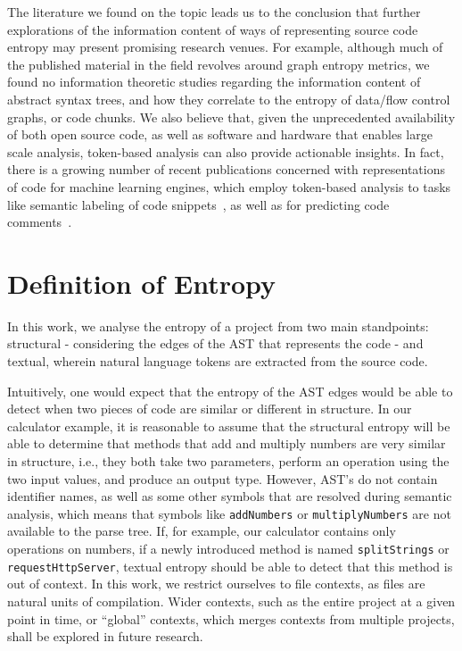 \documentclass[10pt,conference]{IEEEtran}
\begin{document}
The literature we found on the topic leads us to the conclusion that further explorations of the information content of ways of representing source code entropy may present promising research venues. For example, although much of the published material in the field revolves around graph entropy metrics, we found no information theoretic studies regarding the information content of abstract syntax trees, and how they correlate to the entropy of data/flow control graphs, or code chunks. 
We also believe that, given the unprecedented availability of both open source code, as well as software and hardware that enables large scale analysis, token-based analysis can also provide actionable insights. In fact, there is a growing number of recent publications concerned with representations of code for machine learning engines, which employ token-based analysis to tasks like semantic labeling of code snippets~\cite{allamanis2016convolutional}, as well as for predicting code comments~\cite{movshovitz-attias-cohen-2013-natural}.

\section{Definition of Entropy} \label{definition}
In this work, we analyse the entropy of a project from two main standpoints: structural - considering the edges of the AST that represents the code - and textual, wherein natural language tokens are extracted from the source code.

Intuitively, one would expect that the entropy of the AST edges would be able to detect when two pieces of code are similar or different in structure. In our calculator example, it is reasonable to assume that the structural entropy will be able to determine that methods that add and multiply numbers are very similar in structure, i.e., they both take two parameters, perform an operation using the two input values, and produce an output type. However, AST's do not contain identifier names, as well as some other symbols that are resolved during semantic analysis, which means that symbols like \texttt{addNumbers} or \texttt{multiplyNumbers} are not available to the parse tree. If, for example, our calculator contains only operations on numbers, if a newly introduced method is named \texttt{splitStrings} or \texttt{requestHttpServer}, textual entropy should be able to detect that this method is out of context. In this work, we restrict ourselves to file contexts, as files are natural units of compilation. Wider contexts, such as the entire project at a given point in time, or ``global'' contexts, which merges contexts from multiple projects, shall be explored in future research.
\end{document}
